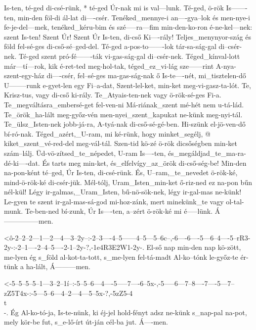   {  Is-ten, té-ged di-csé-rünk, * té-ged Úr-nak mi is val---lunk. Té-ged, ö-rök Is-------ten, min-den föl-di ál-lat di----csér. Tenéked_mennye-i an----gya--lok és men-nye-i  fe-je-del---mek, tenéked_kéru-bim és szé-----ra---fim min-den-ko-ron é-ne-kel---nek: szent Is-ten! Szent Úr!  Szent Úr Is-ten, di-cső Ki----rály! Teljes_menynyor-szág és       föld fel-sé-ges di-cső-sé--ged-del. Té-ged a-pos-to-------lok tár-sa-ság-gal di--csér-nek. Té-ged szent pró-fé-------ták vi-gas-ság-gal di--csér-nek. Téged_kínval-lott már---tí---rok, kik é-ret-ted meg-hol-tak, téged_ez_vi-lág sze------rint A-nya-szent-egy-ház di----csér, fel--sé-ges ma-gas-ság-nak ő Is-te----nét, mi_tisztelen-dő U--------runk e-gyet-len egy Fi--a-dat, Szent-lel-ket, min-ket meg-vi-gasz-ta-lót. Te, Krisz-tus, vagy di-cső ki-rály. Te_Atyais-ten-nek   vagy ö-rök-sé-ges Fi-a.   Te_megváltásra_embersé-get fel-ven-ni  Má-riának_szent mé-hét nem u-tá-lád. Te_örök_ha-lált meg-győz-vén men-nyei_szent_kapukat ne-künk meg-nyi-tál. Te_ülsz_Isten-nek jobb-já-ra, A-tyá-nak di-cső-sé-gé-ben.   Hi-szünk el-jö-ven-dő bí-ró-nak. Téged_azért,_U-ram, mi ké-rünk, hogy minket_segélj, @  kiket_szent_vé-red-del meg-vál-tál. Szen-tid kö-zé  ö-rök dicsőségben min-ket szám--lálj. Üd-vö-zítsed_te_népedet, U-ram Is----ten, és_megáldjad_te_ma-ra-dé-ki----dat. És tarts meg min-ket, és_elfelvígy_az_örök di-cső-ség-be!  Min-den na-pon-ként té--ged,  Úr Is-ten, di-csé-rünk. És, U--ram,_te_nevedet ö-rök-ké, mind-ö-rök-ké di-csér-jük.  Mél-tólj, Uram_Isten_min-ket ő-riz-ned ez na-pon bűn nél-kül!  Légy ir-galmas,_Uram_Isten, bű-nö-sök-nek, légy ir-gal-mas ne-künk! Le-gyen te szent ir-gal-mas-sá-god mi-hoz-zánk, mert minekünk_te vagy ol-tal-munk. Te-ben-ned bí-zunk, Úr Is----ten, a--zért ö-rök-ké mi   é-----lünk. Á---------------men.}


  {<ô-2--2--2---1---2---4---3--2y--:-2--3----4--5------4--5---5--6c--,-6----6----5---6--4----5--rR3-2y-:-2--1----2--4--5----2-1--2y-?,-1e4R3E2W1-2y-.}
  {   El-ső nap min-den nap kö-zött, me-lyen ég s_föld al-kot-ta-tott, s_me-lyen fel-tá-madt Al-ko--tónk le-győz-te ér-tünk a ha-lált, Á---------men.}

  {<-5--5--5--5--1---3--2--1í--:-5--5--6---4----5-----7----6--5x-,-5-----6---7--8----7----5---7--zZ5T4x-:-5---5--6---4--2---4---5--5x-?,-5zZ5-4\\t\\-.}
  {  Ég Al-ko-tó-ja, Is-te-nünk, ki éj-jel hold-fényt adsz ne-künk s_nap-pal na-pot, mely kör-be fut,     s_e-lő-írt út-ján cél-ba jut.  Á----men.}

